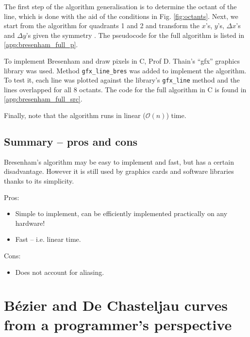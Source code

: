 \documentclass[a4paper]{article}
\begin{document}
The first step of the algorithm generalisation is to determine the octant of the line, which is done with the aid of the conditions in Fig. \ref{fig:octants}. Next, we start from the algorithm for quadrants 1 and 2 and transform the $x$'s, $y$'s, $\Delta x$'s and $\Delta y$'s given the symmetry . The pseudocode for the full algorithm is listed in \ref{app:bresenham_full_p}.

To implement Bresenham and draw pixels in C, Prof D. Thain's ``gfx'' graphics library \cite{thain} was used. Method \texttt{gfx\_line\_bres} was added to implement the algorithm. To test it, each line was plotted against the library's \texttt{gfx\_line} method and the lines overlapped for all 8 octants. The code for the full algorithm in C is found in \ref{app:bresenham_full_src}.

Finally, note that the algorithm runs in linear ($\mathcal{O}(n)$) time.


\subsection{Summary -- pros and cons}
Bresenham's algorithm may be easy to implement and fast, but has a certain disadvantage. However it is still used by graphics cards and software libraries \cite{bhowmick} thanks to its simplicity.

Pros:
\begin{itemize}
	\item Simple to implement, can be efficiently implemented practically on any hardware!
	\item Fast -- i.e. linear time.
\end{itemize}
Cons:
\begin{itemize}
	\item Does not account for aliasing.
\end{itemize}




\clearpage
\section{B\'ezier and De Chasteljau curves from a programmer's perspective}%
\label{sec:bezier_and_de_chasteljau_curves_from_a_programmer_s_perspective}
\end{document}
